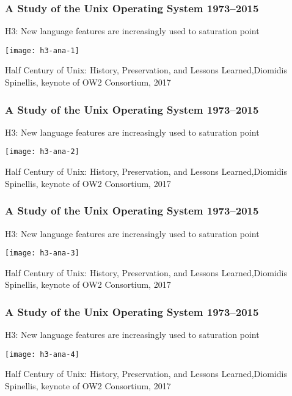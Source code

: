\begin{frame}[plain]
	\frametitle{A Study of the Unix Operating System 1973–2015}
	\centering
	H3: New language features are
	increasingly used to saturation point
	
	
	\texttt{[image: h3-ana-1]}
	
	\tiny Half Century of Unix:
	History, Preservation, and
	Lessons Learned,Diomidis Spinellis, keynote of OW2 Consortium, 2017
	
\end{frame}	

\begin{frame}[plain]
	\frametitle{A Study of the Unix Operating System 1973–2015}
	\centering
	H3: New language features are
	increasingly used to saturation point
	
	
	\texttt{[image: h3-ana-2]}
	
	\tiny Half Century of Unix:
	History, Preservation, and
	Lessons Learned,Diomidis Spinellis, keynote of OW2 Consortium, 2017
	
\end{frame}	

\begin{frame}[plain]
	\frametitle{A Study of the Unix Operating System 1973–2015}
	\centering
	H3: New language features are
	increasingly used to saturation point
	
	
	\texttt{[image: h3-ana-3]}
	
	\tiny Half Century of Unix:
	History, Preservation, and
	Lessons Learned,Diomidis Spinellis, keynote of OW2 Consortium, 2017
	
\end{frame}	

\begin{frame}[plain]
	\frametitle{A Study of the Unix Operating System 1973–2015}
	\centering
	H3: New language features are
	increasingly used to saturation point
	
	
	\texttt{[image: h3-ana-4]}
	
	\tiny Half Century of Unix:
	History, Preservation, and
	Lessons Learned,Diomidis Spinellis, keynote of OW2 Consortium, 2017
	
\end{frame}	

